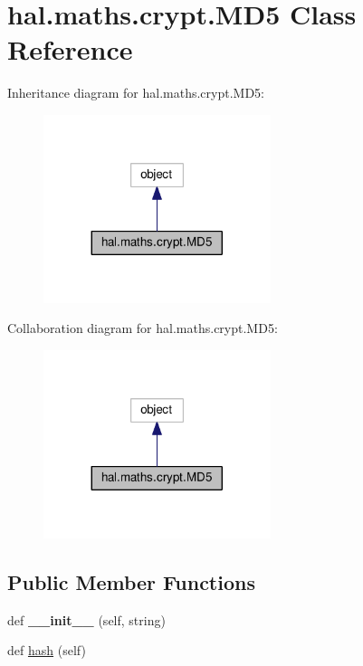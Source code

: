 \hypertarget{classhal_1_1maths_1_1crypt_1_1_m_d5}{}\section{hal.\+maths.\+crypt.\+M\+D5 Class Reference}
\label{classhal_1_1maths_1_1crypt_1_1_m_d5}


Inheritance diagram for hal.\+maths.\+crypt.\+M\+D5\+:
\nopagebreak
\begin{figure}[H]
\begin{center}
\leavevmode
\includegraphics[width=188pt]{classhal_1_1maths_1_1crypt_1_1_m_d5__inherit__graph}
\end{center}
\end{figure}


Collaboration diagram for hal.\+maths.\+crypt.\+M\+D5\+:
\nopagebreak
\begin{figure}[H]
\begin{center}
\leavevmode
\includegraphics[width=188pt]{classhal_1_1maths_1_1crypt_1_1_m_d5__coll__graph}
\end{center}
\end{figure}
\subsection*{Public Member Functions}
\begin{DoxyCompactItemize}
\item 
def {\bfseries \+\_\+\+\_\+init\+\_\+\+\_\+} (self, string)\hypertarget{classhal_1_1maths_1_1crypt_1_1_m_d5_a904093421d68e73ab12f6d00f3e0beff}{}\label{classhal_1_1maths_1_1crypt_1_1_m_d5_a904093421d68e73ab12f6d00f3e0beff}

\item 
def \hyperlink{classhal_1_1maths_1_1crypt_1_1_m_d5_a5f2fcd9c5019f5ace7f70f7a6b514123}{hash} (self)
\end{DoxyCompactItemize}
